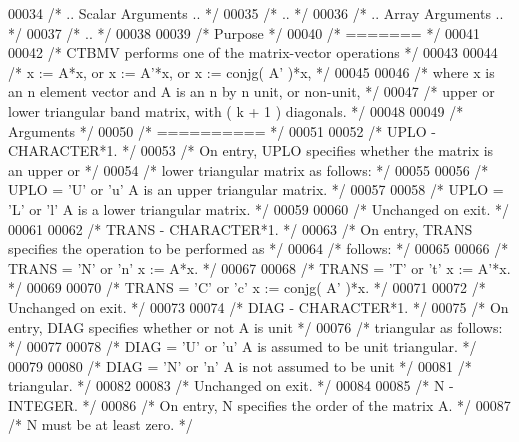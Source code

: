 \begin{DoxyCode}
00034 \textcolor{comment}{/*     .. Scalar Arguments .. */}
00035 \textcolor{comment}{/*     .. */}
00036 \textcolor{comment}{/*     .. Array Arguments .. */}
00037 \textcolor{comment}{/*     .. */}
00038 
00039 \textcolor{comment}{/*  Purpose */}
00040 \textcolor{comment}{/*  ======= */}
00041 
00042 \textcolor{comment}{/*  CTBMV  performs one of the matrix-vector operations */}
00043 
00044 \textcolor{comment}{/*     x := A*x,   or   x := A'*x,   or   x := conjg( A' )*x, */}
00045 
00046 \textcolor{comment}{/*  where x is an n element vector and  A is an n by n unit, or non-unit, */}
00047 \textcolor{comment}{/*  upper or lower triangular band matrix, with ( k + 1 ) diagonals. */}
00048 
00049 \textcolor{comment}{/*  Arguments */}
00050 \textcolor{comment}{/*  ========== */}
00051 
00052 \textcolor{comment}{/*  UPLO   - CHARACTER*1. */}
00053 \textcolor{comment}{/*           On entry, UPLO specifies whether the matrix is an upper or */}
00054 \textcolor{comment}{/*           lower triangular matrix as follows: */}
00055 
00056 \textcolor{comment}{/*              UPLO = 'U' or 'u'   A is an upper triangular matrix. */}
00057 
00058 \textcolor{comment}{/*              UPLO = 'L' or 'l'   A is a lower triangular matrix. */}
00059 
00060 \textcolor{comment}{/*           Unchanged on exit. */}
00061 
00062 \textcolor{comment}{/*  TRANS  - CHARACTER*1. */}
00063 \textcolor{comment}{/*           On entry, TRANS specifies the operation to be performed as */}
00064 \textcolor{comment}{/*           follows: */}
00065 
00066 \textcolor{comment}{/*              TRANS = 'N' or 'n'   x := A*x. */}
00067 
00068 \textcolor{comment}{/*              TRANS = 'T' or 't'   x := A'*x. */}
00069 
00070 \textcolor{comment}{/*              TRANS = 'C' or 'c'   x := conjg( A' )*x. */}
00071 
00072 \textcolor{comment}{/*           Unchanged on exit. */}
00073 
00074 \textcolor{comment}{/*  DIAG   - CHARACTER*1. */}
00075 \textcolor{comment}{/*           On entry, DIAG specifies whether or not A is unit */}
00076 \textcolor{comment}{/*           triangular as follows: */}
00077 
00078 \textcolor{comment}{/*              DIAG = 'U' or 'u'   A is assumed to be unit triangular. */}
00079 
00080 \textcolor{comment}{/*              DIAG = 'N' or 'n'   A is not assumed to be unit */}
00081 \textcolor{comment}{/*                                  triangular. */}
00082 
00083 \textcolor{comment}{/*           Unchanged on exit. */}
00084 
00085 \textcolor{comment}{/*  N      - INTEGER. */}
00086 \textcolor{comment}{/*           On entry, N specifies the order of the matrix A. */}
00087 \textcolor{comment}{/*           N must be at least zero. */}

\end{DoxyCode}

